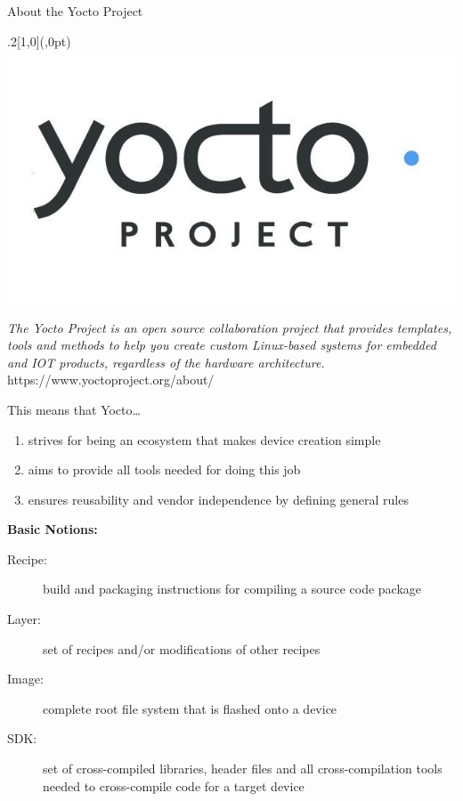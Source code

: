 \documentclass[ucs,9pt]{beamer}
\begin{document}
\begin{frame}
    {About the Yocto Project}

    \begin{textblock*}{.2\paperwidth}[1,0](\paperwidth,0pt)%
        \includegraphics[width=\linewidth]{images/yocto-logo}
    \end{textblock*}%

    \begin{block}{}
        \emph{The Yocto Project is an open source collaboration project that provides templates, tools and methods to help you create custom Linux-based systems for embedded and IOT products, regardless of the hardware architecture.}
        \\
        \hfill\tiny https://www.yoctoproject.org/about/
    \end{block}

    This means that Yocto\ldots
    \begin{enumerate}
        \item strives for being an ecosystem that makes device creation simple
        \item aims to provide all tools needed for doing this job
        \item ensures reusability and vendor independence by defining general rules
    \end{enumerate}
    \medskip
    \pause

    \textbf{Basic Notions:}
    \begin{description}
        \item [Recipe:] build and packaging instructions for compiling a source code package
        \item [Layer:] set of recipes and/or modifications of other recipes
        \item [Image:] complete root file system that is flashed onto a device
        \item [SDK:] set of cross-compiled libraries, header files and all cross-compilation tools needed to cross-compile code for a target device
    \end{description}
    \medskip
\end{frame}
\end{document}
